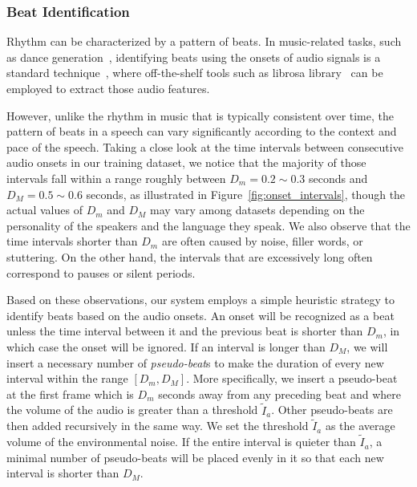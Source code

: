 \documentclass[acmtog,authorversion]{acmart}
\newcommand{\fig}{Figure{}~}
\begin{document}
\subsubsection{Beat Identification}
\label{subsubsec:onset_identification}
Rhythm can be characterized by a pattern of beats. In music-related tasks, such as dance generation~\cite{chen2021choreomaster,aristidou2021rhythm}, identifying beats using the onsets of audio signals is a standard technique~\cite{bello2005onsetTutorial,ellis2007beat}, where off-the-shelf tools such as librosa library~\cite{mcfee2015librosa} can be employed to extract those audio features.

However, unlike the rhythm in music that is typically consistent over time, the pattern of beats in a speech can vary significantly according to the context and pace of the speech. Taking a close look at the time intervals between consecutive audio onsets in our training dataset, we notice that the majority of those intervals fall within a range roughly between $D_m=0.2\sim{}0.3$ seconds and $D_M=0.5\sim{}0.6$ seconds, as illustrated in \fig\ref{fig:onset_intervals}, though the actual values of $D_m$ and $D_M$ may vary among datasets depending on the personality of the speakers and the language they speak. We also observe that the time intervals shorter than $D_m$ are often caused by noise, filler words, or stuttering. On the other hand, the intervals that are excessively long often correspond to pauses or silent periods.

Based on these observations, our system employs a simple heuristic strategy to identify beats based on the audio onsets. An onset will be recognized as a beat unless the time interval between it and the previous beat is shorter than $D_m$, in which case the onset will be ignored. If an interval is longer than $D_M$, we will insert a necessary number of \emph{pseudo-beat}s to make the duration of every new interval within the range $[D_m, D_M]$. More specifically, we insert a pseudo-beat at the first frame which is $D_m$ seconds away from any preceding beat and where the volume of the audio is greater than a threshold $\tilde{I}_a$. Other pseudo-beats are then added recursively in the same way. We set the threshold $\tilde{I}_a$ as the average volume of the environmental noise. If the entire interval is quieter than $\tilde{I}_a$, a minimal number of pseudo-beats will be placed evenly in it so that each new interval is shorter than $D_M$.
\end{document}
